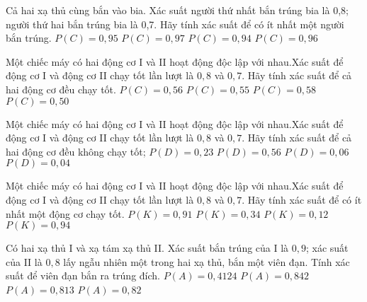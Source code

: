 \begin{ex}
Cả hai xạ thủ cùng bắn vào bia. Xác suất người thứ nhất bắn trúng bia là 0{,}8; người thứ hai bắn trúng bia là 0{,}7. Hãy tính xác suất để có ít nhất một người bắn trúng.
\choice
{$P(C)=0{,}95$}
{$P(C)=0{,}97$}
{\True $P(C)=0{,}94$}
{$P(C)=0{,}96$}
\end{ex}
\begin{ex}
Một chiếc máy có hai động cơ I và II hoạt động độc lập với nhau.Xác suất để động cơ I và động cơ II chạy tốt lần lượt là $0{,}8$ và $0{,}7$. Hãy tính xác suất để cả hai động cơ đều chạy tốt.
\choice
{\True $P(C)=0{,}56$}
{$P(C)=0{,}55$}
{$P(C)=0{,}58$}
{$P(C)=0{,}50$}
\end{ex}
\begin{ex}
Một chiếc máy có hai động cơ I và II hoạt động độc lập với nhau.Xác suất để động cơ I và động cơ II chạy tốt lần lượt là $0{,}8$ và $0{,}7$. Hãy tính xác suất để cả hai động cơ đều không chạy tốt;
\choice
{$P(D)=0{,}23$}
{$P(D)=0{,}56$}
{\True $P(D)=0{,}06$}
{$P(D)=0{,}04$}
\end{ex}
\begin{ex}
Một chiếc máy có hai động cơ I và II hoạt động độc lập với nhau.Xác suất để động cơ I và động cơ II chạy tốt lần lượt là $0{,}8$ và $0{,}7$. Hãy tính xác suất để có ít nhất một động cơ chạy tốt.
\choice
{$P(K)=0{,}91$}
{$P(K)=0{,}34$}
{$P(K)=0{,}12$}
{\True $P(K)=0{,}94$}
\end{ex}
\begin{ex}
Có hai xạ thủ I và xạ tám xạ thủ II. Xác suất bắn trúng của I là $0{,}9$; xác suất của II là $0{,}8$ lấy ngẫu nhiên một trong hai xạ thủ, bắn một viên đạn. Tính xác suất để viên đạn bắn ra trúng đích.
\choice
{$P(A)=0{,}4124$}
{$P(A)=0{,}842$}
{$P(A)=0{,}813$}
{\True $P(A)=0{,}82$}
\end{ex}
